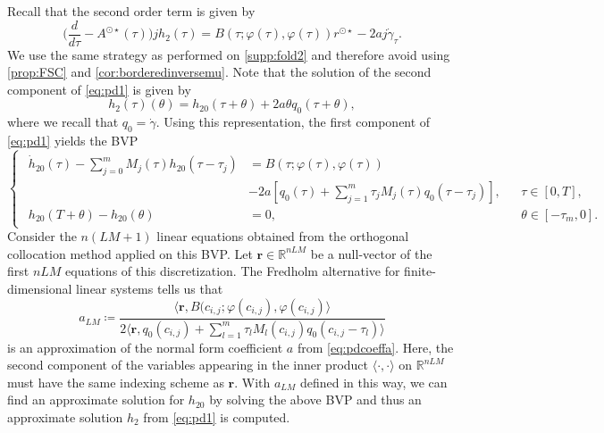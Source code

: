 \documentclass[english]{myarticle}
\begin{document}
\begin{sloppypar}
Recall that the second order term is given by
\begin{equation} \label{eq:pd1}
    \bigg(\frac{d}{d \tau} - A^{\odot \star}(\tau) \bigg) jh_2(\tau) = B(\tau;\varphi(\tau),\varphi(\tau))r^{\odot \star} - 2aj\dot{\gamma}_\tau.
\end{equation}
We use the same strategy as performed on \eqref{supp:fold2} and therefore avoid using \cref{prop:FSC} and \cref{cor:borderedinversemu}. Note that the solution of the second component of \eqref{eq:pd1} is given by
\begin{equation} \label{eq:h2supppd}
    h_2(\tau)(\theta) = h_{20}(\tau+\theta) + 2 a \theta q_0(\tau+\theta),
\end{equation}
where we recall that $q_0 = \dot{\gamma}$. Using this representation, the first component of \eqref{eq:pd1} yields the BVP
\begin{equation*}
    \begin{cases}
    \begin{aligned}
        \dot{h}_{20}(\tau) - \textstyle\sum_{j=0}^{m} M_j(\tau) h_{20}(\tau-\tau_j) &= B(\tau; \varphi(\tau),\varphi(\tau)) \\
        &-2a[q_0(\tau) + \textstyle\sum_{j=1}^m \tau_j M_j(\tau) q_0(\tau-\tau_j)], &&\tau \in [0,T], \\
        h_{20}(T + \theta) - h_{20}(\theta) &= 0, &&\theta \in [-\tau_m,0].
    \end{aligned}
    \end{cases}
\end{equation*}
Consider the $n(LM+1)$ linear equations obtained from the orthogonal collocation method applied on this BVP. Let $\mathbf{r} \in \mathbb{R}^{nLM}$ be a null-vector of the first $nLM$ equations of this discretization. The Fredholm alternative for finite-dimensional linear systems tells us that
\begin{equation} \label{eq:aLM}
    a_{LM} \coloneqq \frac{\langle \mathbf{r}, B(c_{i,j}; \varphi(c_{i,j}), \varphi(c_{i,j}) \rangle}{ 2\langle \mathbf{r}, q_0(c_{i,j}) + \sum_{l=1}^m \tau_l M_l(c_{i,j}) q_0(c_{i,j}-\tau_l) \rangle}
\end{equation}
is an approximation of the normal form coefficient $a$ from \eqref{eq:pdcoeffa}. Here, the second component of the variables appearing in the inner product $\langle \cdot , \cdot \rangle$ on $\mathbb{R}^{nLM}$ must have the same indexing scheme as $\mathbf{r}$. With $a_{LM}$ defined in this way, we can find an approximate solution for $h_{20}$ by solving the above BVP and thus an approximate solution $h_2$ from \eqref{eq:pd1} is computed.


\end{sloppypar}
\end{document}
